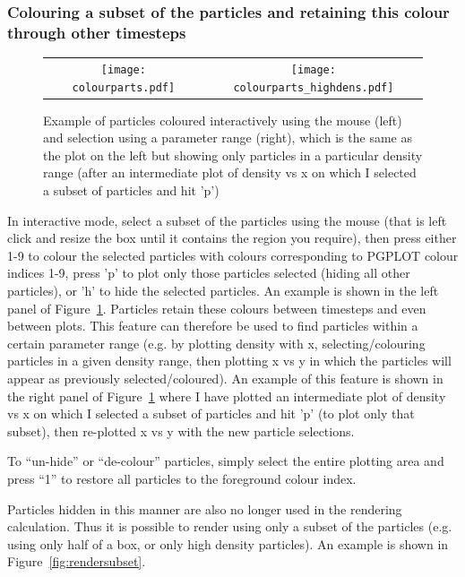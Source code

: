 \documentclass[a4paper,11pt]{article}
\begin{document}
\subsubsection{ Colouring a subset of the particles and retaining this colour through other timesteps}
\label{sec:colourparts}

\begin{figure}
\centering
\begin{tabular}{cc}
\texttt{[image: colourparts.pdf]} &
\texttt{[image: colourparts\_highdens.pdf]}
\end{tabular}
\caption{Example of particles coloured interactively using the mouse (left) and selection using a parameter range (right), which is the same as the plot on the left but showing only particles in a particular density range (after an intermediate plot of density vs x on which I selected a subset of particles and hit 'p')}
\label{fig:colourparts}
\end{figure}

 In interactive mode, select a subset of the particles using the mouse (that is left click and resize the box until it contains the region you require), then press either 1-9 to colour the selected particles with colours corresponding to PGPLOT colour indices 1-9, press 'p' to plot only those particles selected (hiding all other particles), or 'h' to hide the selected particles. An example is shown in the left panel of Figure~\ref{fig:colourparts}.  Particles retain these colours between timesteps and even between plots. This feature can therefore be used to find particles within a certain parameter range (e.g. by plotting density with x, selecting/colouring particles in a given density range, then plotting x vs y in which the particles will appear as previously selected/coloured). An example of this feature is shown in the right panel of Figure~\ref{fig:colourparts} where I have plotted an intermediate plot of density vs x on which I selected a subset of particles and hit 'p' (to plot only that subset), then re-plotted x vs y with the new particle selections.
 
 To ``un-hide'' or ``de-colour'' particles, simply select the entire plotting area and press ``1'' to restore all particles to the foreground colour index.
 
  Particles hidden in this manner are also no longer used in the rendering calculation. Thus it is possible to render using only a subset of the particles (e.g. using only half of a box, or only high density particles). An example is shown in Figure~\ref{fig:rendersubset}.
\end{document}
